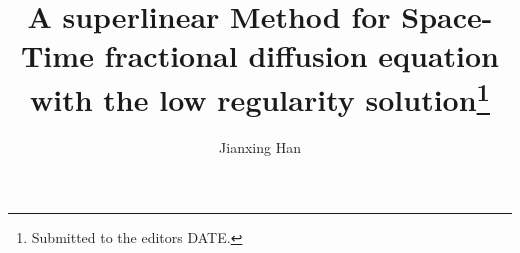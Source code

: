 

\usepackage{lipsum}
\usepackage{amsfonts}
\usepackage{graphicx}
\usepackage{epstopdf}
\usepackage{algorithmic}
\usepackage{amsmath, amssymb}
\ifpdf
\else
\fi

\newcommand{\creflastconjunction}{, and~}



\title{A superlinear Method for Space-Time fractional diffusion equation with the low regularity solution\thanks{Submitted to the editors DATE.
}}

\author{Jianxing Han}%

\usepackage{amsopn}
\DeclareMathOperator{\diag}{diag}


